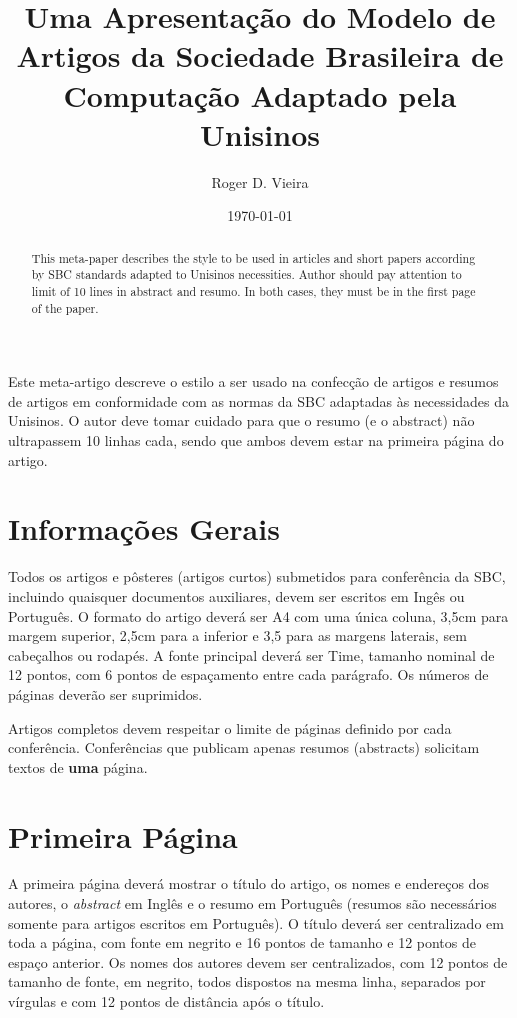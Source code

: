 \documentclass[12pt]{article}
\date{\today}
\title{
    Uma Apresentação do Modelo de Artigos da Sociedade Brasileira de Computação Adaptado pela Unisinos
}
\author{Roger D. Vieira\inst{1}}
\begin{document}
 

\imprimircapa
\imprimirfolhaderosto


\maketitle

\begin{abstract}

This meta-paper describes the style to be used in articles and short papers according by SBC standards adapted to Unisinos necessities. Author should pay attention to limit of 10 lines in abstract and resumo. In both cases, they must be in the first page of the paper.
\end{abstract}
     
\begin{resumo} 
  Este meta-artigo descreve o estilo a ser usado na confecção de artigos e resumos de artigos em conformidade com as normas da SBC adaptadas às necessidades da Unisinos. O autor deve tomar cuidado para que o resumo (e o abstract) não ultrapassem 10 linhas cada, sendo que ambos devem estar na primeira
  página do artigo.
\end{resumo}


\section{Informações Gerais}


Todos os artigos e pôsteres (artigos curtos) submetidos para conferência da SBC, incluindo quaisquer documentos auxiliares, devem ser escritos em Ingês ou Português. O formato do artigo deverá ser A4 com uma única coluna, 3,5cm para margem superior,  2,5cm para a inferior e 3,5 para as margens laterais, sem cabeçalhos ou rodapés. A fonte principal deverá ser Time, tamanho nominal de 12 pontos, com 6 pontos de espaçamento entre cada parágrafo. Os números de páginas deverão ser suprimidos.

Artigos completos devem respeitar o limite de páginas definido por cada conferência. Conferências que publicam apenas resumos (abstracts) solicitam textos de \textbf{uma} página.

\section{Primeira Página} \label{sec:firstpage}

A primeira página deverá mostrar o título do artigo, os nomes e endereços dos autores, o \emph{abstract} em Inglês e o resumo em Português (resumos são necessários somente para artigos escritos em Português). O título deverá ser centralizado em toda a página, com fonte em negrito e 16 pontos de tamanho e 12 pontos de espaço anterior. Os nomes dos autores devem ser centralizados, com 12 pontos de tamanho de fonte, em negrito, todos dispostos na mesma linha, separados por vírgulas e com 12 pontos de distância após o título. 
\end{document}
